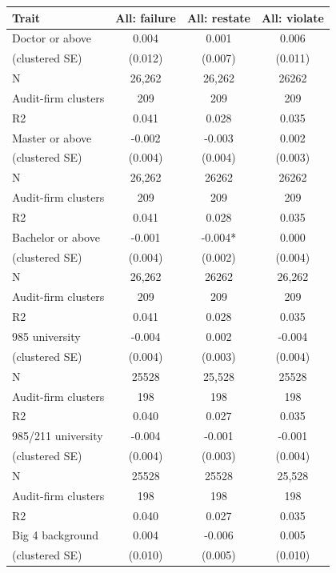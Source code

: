 \documentclass[10pt]{article}
\begin{document}
\begin{minipage}{19cm}\fontsize{10}{12}\selectfont\setlength{\tabcolsep}{4pt}\renewcommand{\arraystretch}{1.12}


\centering
{}
\begin{threeparttable}
\begin{tabular}{p{}ccc}
\toprule
Trait & All: failure & All: restate & All: violate \\
\midrule
Doctor or above & 0.004 & 0.001 & 0.006 \\
(clustered SE) & (0.012) & (0.007) & (0.011) \\
N & 26,262 & 26,262 & 26262 \\
Audit-firm clusters & 209 & 209 & 209 \\
R2 & 0.041 & 0.028 & 0.035 \\
Master or above & -0.002 & -0.003 & 0.002 \\
(clustered SE) & (0.004) & (0.004) & (0.003) \\
N & 26,262 & 26262 & 26262 \\
Audit-firm clusters & 209 & 209 & 209 \\
R2 & 0.041 & 0.028 & 0.035 \\
Bachelor or above & -0.001 & -0.004* & 0.000 \\
(clustered SE) & (0.004) & (0.002) & (0.004) \\
N & 26,262 & 26262 & 26,262 \\
Audit-firm clusters & 209 & 209 & 209 \\
R2 & 0.041 & 0.028 & 0.035 \\
985 university & -0.004 & 0.002 & -0.004 \\
(clustered SE) & (0.004) & (0.003) & (0.004) \\
N & 25528 & 25,528 & 25528 \\
Audit-firm clusters & 198 & 198 & 198 \\
R2 & 0.040 & 0.027 & 0.035 \\
985/211 university & -0.004 & -0.001 & -0.001 \\
(clustered SE) & (0.004) & (0.003) & (0.004) \\
N & 25528 & 25528 & 25,528 \\
Audit-firm clusters & 198 & 198 & 198 \\
R2 & 0.040 & 0.027 & 0.035 \\
Big 4 background & 0.004 & -0.006 & 0.005 \\
(clustered SE) & (0.010) & (0.005) & (0.010) \\

\end{tabular}
\end{threeparttable}
\end{minipage}
\end{document}
